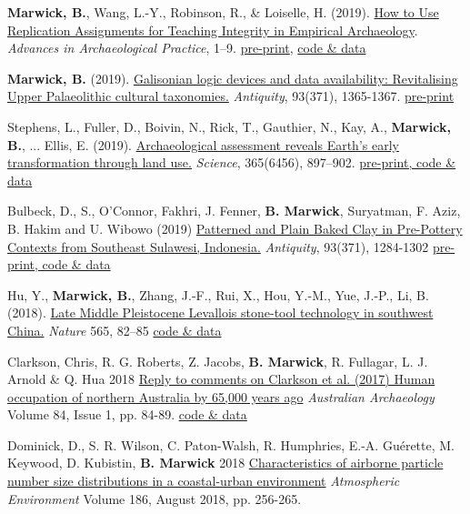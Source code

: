 \documentclass[11pt,article,oneside]{memoir}
\begin{document}

\ind \textbf{Marwick, B.}, Wang, L.-Y., Robinson, R., \& Loiselle, H. (2019). \href{https://doi.org/10.1017/aap.2019.38}{How to Use Replication Assignments for Teaching Integrity in Empirical Archaeology}. \textit{Advances in Archaeological Practice}, 1–9. \href{https://osf.io/preprints/socarxiv/tsxbv/}{pre-print}, \href{https://doi.org/10.17605/OSF.IO/DBSW9}{code \& data}

\ind \textbf{Marwick, B.} (2019). \href{https://doi.org/10.15184/aqy.2019.131}{Galisonian logic devices and data availability: Revitalising Upper Palaeolithic cultural taxonomies.} \textit{Antiquity}, 93(371), 1365-1367. \href{https://osf.io/preprints/socarxiv/v8dej/}{pre-print}

\ind Stephens, L., Fuller, D., Boivin, N., Rick, T., Gauthier, N., Kay, A., \textbf{Marwick, B.}, ...  Ellis, E. (2019). \href{https://doi.org/10.1126/science.aax1192}{Archaeological assessment reveals Earth’s early transformation through land use.} \textit{Science}, 365(6456), 897–902. \href{https://dataverse.harvard.edu/dataverse/ArchaeoGLOBE}{pre-print, code \& data}

\ind Bulbeck, D., S., O’Connor, Fakhri, J. Fenner,  \textbf{B. Marwick}, Suryatman, F. Aziz, B. Hakim and U. Wibowo (2019) \href{https://doi.org/10.15184/aqy.2019.134}{Patterned and Plain Baked Clay in Pre-Pottery Contexts from Southeast Sulawesi, Indonesia.} \textit{Antiquity}, 93(371), 1284-1302 \href{https://osf.io/jn5tu/}{pre-print, code \& data}

\ind Hu, Y., \textbf{Marwick, B.}, Zhang, J.-F., Rui, X., Hou, Y.-M., Yue, J.-P., Li, B. (2018). \href{https://doi.org/10.1038/s41586-018-0710-1}{Late Middle Pleistocene Levallois stone-tool technology in southwest China.} \textit{Nature}  565, 82–85 \href{https://osf.io/erntj/}{code \& data}

\ind Clarkson, Chris, R. G. Roberts, Z. Jacobs, \textbf{B. Marwick}, R. Fullagar, L. J. Arnold \& Q. Hua 2018 \href{https://doi.org/10.1080/03122417.2018.1462884}{Reply to comments on Clarkson et al. (2017) Human occupation of northern Australia by 65,000 years ago} \textit{Australian Archaeology} Volume 84, Issue 1, pp. 84-89. \href{https://osf.io/qydc9/}{code \& data}

\ind Dominick, D., S. R. Wilson, C. Paton-Walsh, R. Humphries, E.-A. Guérette, M. Keywood, D. Kubistin, \textbf{B. Marwick} 2018 \href{http://doi.org/10.1016/j.atmosenv.2018.05.031}{Characteristics of airborne particle number size distributions in a coastal-urban environment}  \textit{Atmospheric Environment} Volume 186, August 2018, pp. 256-265.
\end{document}
